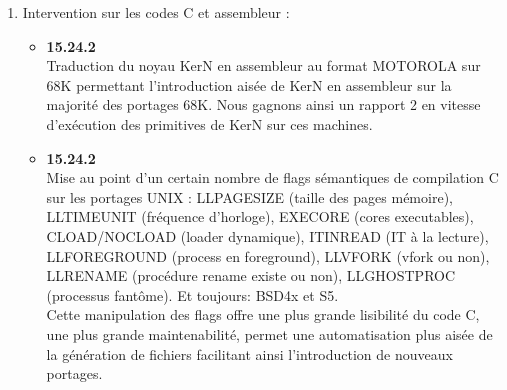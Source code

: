\begin {enumerate}
\begin {itemize}
\item {\bf 15.25} \\
Modification du protocole de recherche des symboles C dans la table
des symboles: on d\'{e}conseille dor\'{e}navant l'utilisation du '\_' devant
les symboles pass\'{e}s \`{a} GETGLOBAL. Nous conservons la
possibilit\'{e} de le faire, mais au d\'{e}triment des performances de
recherche du symbole. L'option optimale est celle o\`{u} le nom C exact
apparait comme argument du GETGLOBAL.
Le code C est modifi\'{e} en cons\'{e}quence.

\item {\bf 15.25} \\
Possibilit\'{e} de suivre (STEP) les fonctions appel\'{e}es par {\tt SEND}
(sauf en mode graphique).

\item {\bf 15.25} \\
Quelques interventions ont \'{e}t\'{e} faites sur le code du Bitmap Virtuel
pour corriger certaines erreurs, mais aussi pour permettre
les incarnations du BV sur Motif et sur PostScript.

\end {itemize}

\item Intervention sur les codes C et assembleur :

\begin {itemize}

\item {\bf 15.24.2} \\
Traduction du noyau KerN en assembleur au format MOTOROLA sur
68K permettant l'introduction ais\'{e}e de KerN en assembleur sur la
majorit\'{e} des portages 68K. Nous gagnons ainsi un rapport 2 en vitesse
d'ex\'{e}cution des primitives de KerN sur ces machines.

\item {\bf 15.24.2} \\
Mise au point d'un certain nombre de flags s\'{e}mantiques de
compilation C sur les portages UNIX : 
LLPAGESIZE (taille des pages m\'{e}moire), LLTIMEUNIT
(fr\'{e}quence d'horloge), EXECORE (cores executables), CLOAD/NOCLOAD
(loader dynamique), ITINREAD (IT \`{a} la lecture), LLFOREGROUND (process
en foreground), LLVFORK (vfork ou non), LLRENAME (proc\'{e}dure rename
existe ou non), LLGHOSTPROC (processus fant\^{o}me). Et toujours: BSD4x
et S5. \\
Cette manipulation des flags offre une plus grande lisibilit\'{e} du code
C,  une plus grande maintenabilit\'{e}, permet une automatisation plus
ais\'{e}e de la 
g\'{e}n\'{e}ration de fichiers facilitant ainsi l'introduction de
nouveaux portages.



\end{itemize}
\end{enumerate}
